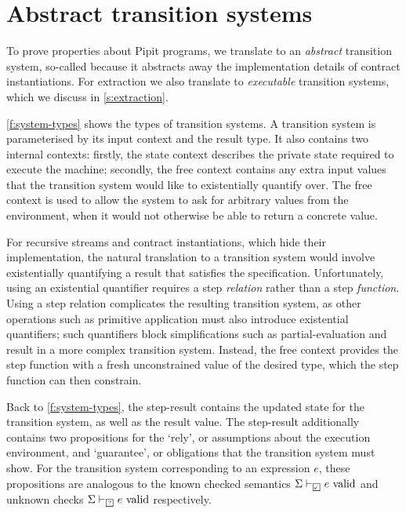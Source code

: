 
\section{Abstract transition systems}
\label{s:transition}


To prove properties about Pipit programs, we translate to an \emph{abstract} transition system, so-called because it abstracts away the implementation details of contract instantiations.
For extraction we also translate to \emph{executable} transition systems, which we discuss in \autoref{s:extraction}.

\autoref{f:system-types} shows the types of transition systems.
A transition system is parameterised by its input context and the result type.
It also contains two internal contexts: firstly, the state context describes the private state required to execute the machine; secondly, the free context contains any extra input values that the transition system would like to existentially quantify over.
The free context is used to allow the system to ask for arbitrary values from the environment, when it would not otherwise be able to return a concrete value.

For recursive streams and contract instantiations, which hide their implementation, the natural translation to a transition system would involve existentially quantifying a result that satisfies the specification.
Unfortunately, using an existential quantifier requires a step \emph{relation} rather than a step \emph{function}.
Using a step relation complicates the resulting transition system, as other operations such as primitive application must also introduce existential quantifiers; such quantifiers block simplifications such as partial-evaluation and result in a more complex transition system.
Instead, the free context provides the step function with a fresh unconstrained value of the desired type, which the step function can then constrain.

Back to \autoref{f:system-types}, the step-result contains the updated state for the transition system, as well as the result value.
The step-result additionally contains two propositions for the `rely', or assumptions about the execution environment, and `guarantee', or obligations that the transition system must show.
For the transition system corresponding to an expression $e$, these propositions are analogous to the known checked semantics $\semcheck{\Sigma}{\PSValid}{e}$ and unknown checks $\semcheck{\Sigma}{\PSUnknown}{e}$ respectively.

